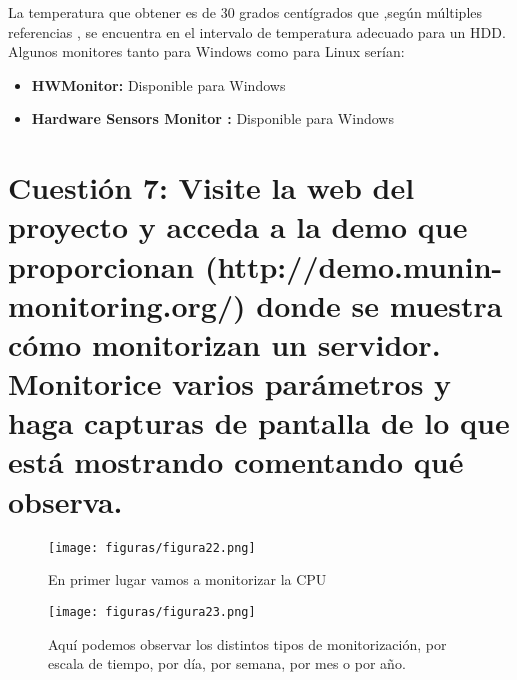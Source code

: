 La temperatura que obtener es de 30 grados centígrados que ,según múltiples referencias \cite{hddt} \cite{hddt2}, se encuentra en el intervalo de temperatura adecuado para un HDD.\\

Algunos monitores tanto para Windows como para Linux serían:
\begin{itemize}
	\item \textbf{HWMonitor\cite{hwm}: } Disponible  para Windows 
	\item \textbf{Hardware Sensors Monitor \cite{hsm}: } Disponible para Windows
\end{itemize}


\section{Cuestión 7: Visite la web del proyecto y acceda a la demo que proporcionan (http://demo.munin-monitoring.org/) donde se muestra cómo monitorizan un servidor. Monitorice varios parámetros y haga capturas de pantalla de lo que está mostrando comentando qué observa.}
\begin{figure}[H] %
	\centering
	\texttt{[image: figuras/figura22.png]}  %
	\label{figura22}
	
	\caption{En primer lugar vamos a monitorizar la CPU} 
\end{figure}
\begin{figure}[H] %
	\centering
	\texttt{[image: figuras/figura23.png]}  %
	\label{figura23}
	
	\caption{Aquí podemos observar los distintos tipos de monitorización, por escala de tiempo, por día, por semana, por mes o por año.} 
\end{figure}

